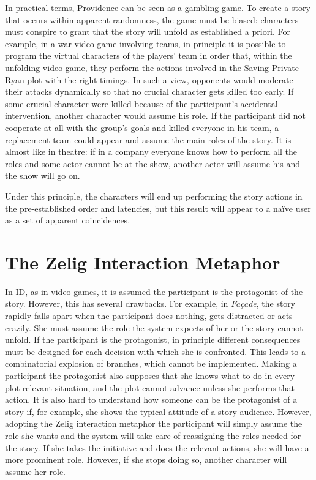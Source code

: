 \documentclass[
		twoside,openright,titlepage,numbers=noenddot,manychapters,
		headinclude,%
                footinclude=false,cleardoublepage=empty,
                BCOR=5mm,
		fontsize=11pt, %
                 enabledeprecatedfontcommands]{scrreprt}
\begin{document}
In practical terms, Providence can be seen as a gambling game. To create a story that occurs within apparent randomness, the game must be biased: characters must conspire to grant that the story will unfold as established a priori. For example, in a war video-game involving teams, in principle it is possible to program the virtual characters of the players’ team in order that, within the unfolding video-game, they perform the actions involved in the Saving Private Ryan plot with the right timings. In such a view, opponents would moderate their attacks dynamically so that no crucial character gets killed too early. If some crucial character were killed because of the participant’s accidental intervention, another character would assume his role. If the participant did not cooperate at all with the group’s goals and killed everyone in his team, a replacement team could appear and assume the main roles of the story. It is almost like in theatre: if in a company everyone knows how to perform all the roles and some actor cannot be at the show, another actor will assume his and the show will go on.

Under this principle, the characters will end up performing the story actions in the pre-established order and latencies, but this result will appear to a naïve user as a set of apparent coincidences. 


\section{The Zelig Interaction Metaphor}
In ID, as in video-games, it is assumed the participant is the protagonist of the story. However, this has several drawbacks. For example, in \emph{Façade}, the story rapidly falls apart when the participant does nothing, gets distracted or acts crazily. She must assume the role the system expects of her or the story cannot unfold. If the participant is the protagonist, in principle different consequences must be designed for each decision with which she is confronted. This leads to a combinatorial explosion of branches, which cannot be implemented. Making a participant the protagonist also supposes that she knows what to do in every plot-relevant situation, and the plot cannot advance unless she performs that action. It is also hard to understand how someone can be the protagonist of a story if, for example, she shows the typical attitude of a story audience. However, adopting the Zelig interaction metaphor the participant will simply assume the role she wants and the system will take care of reassigning the roles needed for the story. If she takes the initiative and does the relevant actions, she will have a more prominent role. However, if she stops doing so, another character will assume her role.
\end{document}
